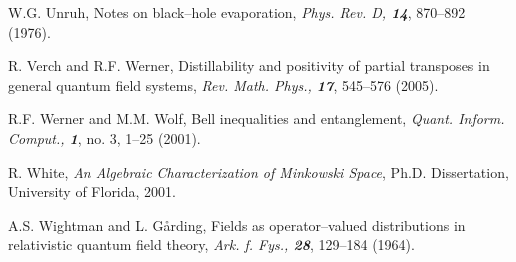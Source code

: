 \documentclass[12pt]{article}
\begin{document}
\begin{thebibliography}{Bor}
W.G. Unruh, Notes on black--hole evaporation, {\sl Phys. Rev. D, \bf  14},
870--892 (1976).

R. Verch and R.F. Werner, Distillability and positivity of
partial transposes in general quantum field systems, {\sl Rev. Math. Phys.,
\bf 17}, 545--576 (2005).

R.F. Werner and M.M. Wolf,  Bell inequalities and entanglement,
{\sl Quant. Inform. Comput., \bf  1},  no. 3, 1--25 (2001).

R. White, {\it An Algebraic Characterization of Minkowski Space}, 
Ph.D. Dissertation, University of Florida, 2001.

A.S. Wightman and L. G\aa rding, Fields as operator--valued distributions
in relativistic quantum field theory, {\sl Ark. f. Fys., \bf 28}, 129--184
(1964).

\end{thebibliography}
\end{document}
